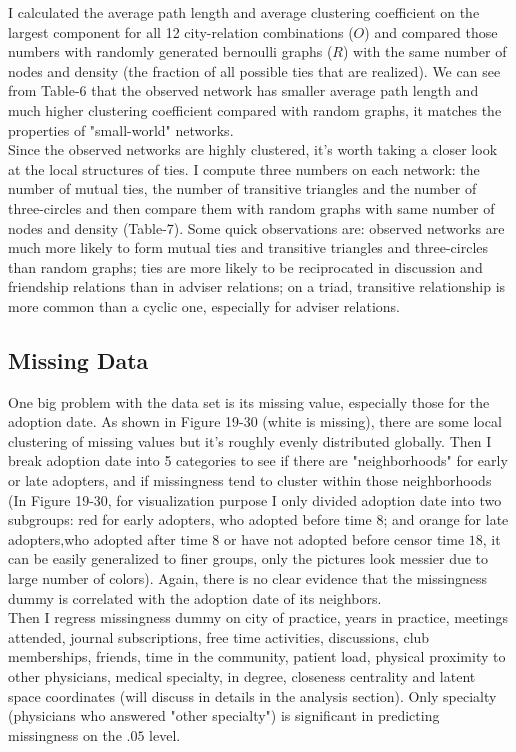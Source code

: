 \documentclass[11pt]{article}
\begin{document}
I calculated the average path length and average clustering coefficient on the largest component for all 12 city-relation combinations ($O$) and compared those numbers with randomly generated bernoulli graphs ($R$) with the same number of nodes and density (the fraction of all possible ties that are realized). We can see from Table-6 that the observed network has smaller average path length and much higher clustering coefficient compared with random graphs, it matches the properties of "small-world" networks.\\

Since the observed networks are highly clustered, it's worth taking a closer look at the local structures of ties. I compute three numbers on each network: the number of mutual ties, the number of transitive triangles and the number of three-circles and then compare them with random graphs with same number of nodes and density (Table-7). Some quick observations are: observed networks are much more likely to form mutual ties and transitive triangles and three-circles than random graphs; ties are more likely to be reciprocated in discussion and friendship relations than in adviser relations; on a triad, transitive relationship is more common than a cyclic one, especially for adviser relations. 



\subsection{Missing Data}

One big problem with the data set is its missing value, especially those for the adoption date. As shown in Figure 19-30 (white is missing), there are some local clustering of missing values but it's roughly evenly distributed globally. Then I break adoption date into 5 categories to see if there are "neighborhoods" for early or late adopters, and if missingness tend to cluster within those neighborhoods (In Figure 19-30, for visualization purpose I only divided adoption date into two subgroups: red for early adopters, who adopted before time $8$; and orange for late adopters,who adopted after time $8$ or have not adopted before censor time $18$, it can be easily generalized to finer groups, only the pictures look messier due to large number of colors). Again, there is no clear evidence that the missingness dummy is correlated with the adoption date of its neighbors. \\

Then I regress missingness dummy on city of practice, years in practice, meetings attended, journal subscriptions, free time activities, discussions, club memberships, friends, time in the community, patient load, physical proximity to other physicians, medical specialty, in degree, closeness centrality and latent space coordinates (will discuss in details in the analysis section). Only specialty (physicians who answered "other specialty") is significant in predicting missingness on the $.05$ level. \\
\end{document}
